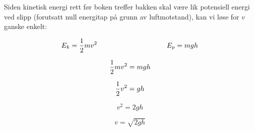 \vskip 10pt

Siden kinetisk energi rett før boken treffer bakken skal være lik potensiell energi ved slipp (forutsatt null energitap på grunn av luftmotstand), kan vi løse for $v$ ganske enkelt:

$$E_k = {1 \over 2}mv^2 \hbox{\hskip 100pt} E_p = mgh$$

$${1 \over 2}mv^2 = mgh$$

$${1 \over 2}v^2 = gh$$

$$v^2 = 2gh$$

$$v = \sqrt{2gh}$$









